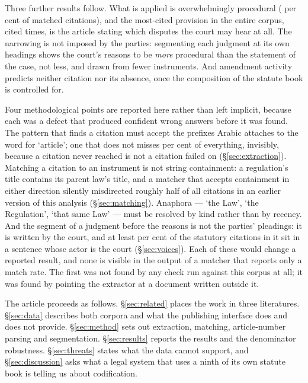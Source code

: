 \documentclass[11pt]{article}
\begin{document}
Three further results follow. What is applied is overwhelmingly procedural
(\nProceduralShare{} per cent of matched citations), and the most-cited
provision in the entire corpus, cited \nTopArticleCitations{} times, is the
article stating which disputes the court may hear at all. The narrowing is
not imposed by the parties: segmenting each judgment at its own headings
shows the court's reasons to be \emph{more} procedural than the statement of
the case, not less, and drawn from fewer instruments. And amendment activity
predicts neither citation nor its absence, once the composition of the
statute book is controlled for.

Four methodological points are reported here rather than left implicit,
because each was a defect that produced confident wrong answers before it was
found. The pattern that finds a citation must accept the prefixes Arabic
attaches to the word for `article'; one that does not misses
\nPrefixGapShare{} per cent of everything, invisibly, because a citation never
reached is not a citation failed on (§\ref{sec:extraction}). Matching a
citation to an instrument is not string containment: a
regulation's title contains its parent law's title, and a matcher that
accepts containment in either direction silently misdirected roughly half of
all citations in an earlier version of this analysis (§\ref{sec:matching}).
Anaphora --- `the Law', `the Regulation', `that same Law' --- must be
resolved by kind rather than by recency. And the segment of a judgment before
the reasons is not the parties' pleadings: it is written by the court, and at
least \nRecitalByCourtShare{} per cent of the statutory citations in it sit
in a sentence whose actor is the court (§\ref{sec:voices}). Each of these
would change a reported result, and none is visible in the output of a
matcher that reports only a match rate. The first was not found by any check
run against this corpus at all; it was found by pointing the extractor at a
document written outside it.

The article proceeds as follows. §\ref{sec:related} places the work in three
literatures. §\ref{sec:data} describes both corpora and what the publishing
interface does and does not provide. §\ref{sec:method} sets out extraction,
matching, article-number parsing and segmentation. §\ref{sec:results} reports
the results and the denominator robustness. §\ref{sec:threats} states what
the data cannot support, and §\ref{sec:discussion} asks what a legal system
that uses a ninth of its own statute book is telling us about codification.
\end{document}
